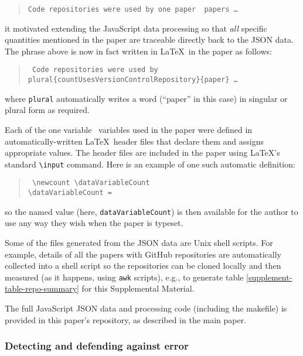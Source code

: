 \documentclass[10pt,a4paper]{article}
\def\supplement{Supplemental Material}
\def\plural#1#2{\ifnum #1=1 
	one #2%
\else
	\the#1\ #2s%
\fi}
\begin{document}
\begin{quote}
\tt Code repositories were used by \plural{\countUsesVersionControlRepository}{paper} \ldots
\end{quote}

it motivated extending the JavaScript data processing so that \emph{all\/} specific quantities mentioned in the paper are traceable directly back to the JSON data. The phrase above is now in fact written in \LaTeX\ in the paper as follows:

\begin{quote}\tt\small
Code repositories were used by \\
\bslash plural\{\bslash countUsesVersionControlRepository\}\{paper\} \ldots
\end{quote}

where {\tt\small \bslash plural} automatically writes a word (``paper'' in this case) in singular or plural form as required. 

Each of the \plural{\dataVariableCount}{variable} used in the paper were defined in automatically-written \LaTeX\ header files that declare them and assigns appropriate values. The header files are included in the paper using \LaTeX's standard \texttt{\textbackslash input} command. Here is an example of one such automatic definition:

\begin{verse}\tt
\textbackslash newcount \textbackslash dataVariableCount \\
\textbackslash dataVariableCount = \the\dataVariableCount
\end{verse}

so the named value (here, \texttt{dataVariableCount}) is then available for the author to use any way they wish when the paper is typeset.

Some of the files generated from the JSON data are Unix shell scripts. For example, details of all the papers with GitHub repositories are automatically collected into a shell script so the repositories can be cloned locally and then measured (as it happens, using \texttt{awk} scripts), e.g., to generate table \ref{supplement-table-repo-summary} for this \supplement.

The full JavaScript JSON data and processing code (including the makefile) is provided in this paper's repository, as described in the main paper.

\subsubsection{Detecting and defending against error}
\label{supplement-detecting-against-error}
\end{document}

